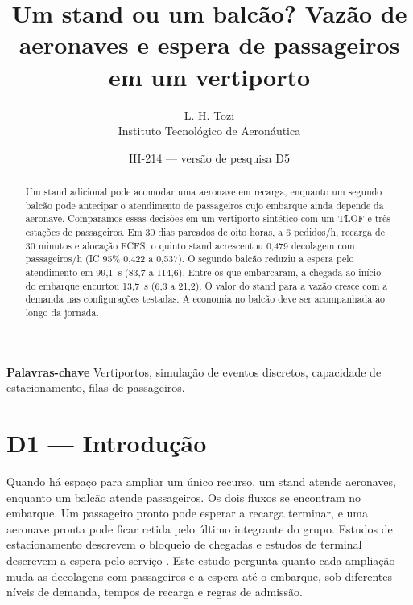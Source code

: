 \documentclass[12pt,a4paper]{article}
\begin{document}
\title{Um stand ou um balcão? Vazão de aeronaves e espera de passageiros em um vertiporto}
\author{L. H. Tozi \\ Instituto Tecnológico de Aeronáutica}
\date{IH-214 --- versão de pesquisa D5}
\maketitle
\begin{abstract}
Um stand adicional pode acomodar uma aeronave em recarga, enquanto um segundo balcão pode antecipar o atendimento de passageiros cujo embarque ainda depende da aeronave. Comparamos essas decisões em um vertiporto sintético com um TLOF e três estações de passageiros. Em 30 dias pareados de oito horas, a 6 pedidos/h, recarga de 30 minutos e alocação FCFS, o quinto stand acrescentou 0,479 decolagem com passageiros/h (IC 95\% 0,422 a 0,537). O segundo balcão reduziu a espera pelo atendimento em 99,1~s (83,7 a 114,6). Entre os que embarcaram, a chegada ao início do embarque encurtou 13,7~s (6,3 a 21,2). O valor do stand para a vazão cresce com a demanda nas configurações testadas. A economia no balcão deve ser acompanhada ao longo da jornada.
\end{abstract}
\noindent\textbf{Palavras-chave} Vertiportos, simulação de eventos discretos, capacidade de estacionamento, filas de passageiros.

\section{D1 — Introdução}
Quando há espaço para ampliar um único recurso, um stand atende aeronaves, enquanto um balcão atende passageiros. Os dois fluxos se encontram no embarque. Um passageiro pronto pode esperar a recarga terminar, e uma aeronave pronta pode ficar retida pelo último integrante do grupo. Estudos de estacionamento descrevem o bloqueio de chegadas e estudos de terminal descrevem a espera pelo serviço \citep{guerreiro2020,feldhoff2022}. Este estudo pergunta quanto cada ampliação muda as decolagens com passageiros e a espera até o embarque, sob diferentes níveis de demanda, tempos de recarga e regras de admissão.








\end{document}
